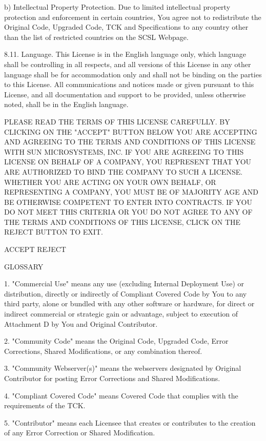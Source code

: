 {b) Intellectual Property Protection.  Due to limited intellectual
property protection and enforcement in certain countries, You agree
not to redistribute the Original Code, Upgraded Code, TCK and
Specifications to any country other than the list of restricted
countries on the SCSL Webpage.

8.11.  Language.  This License is in the English language only, which
language shall be controlling in all respects, and all versions of
this License in any other language shall be for accommodation only and
shall not be binding on the parties to this License.  All
communications and notices made or given pursuant to this License, and
all documentation and support to be provided, unless otherwise noted,
shall be in the English language.

PLEASE READ THE TERMS OF THIS LICENSE CAREFULLY.  BY CLICKING ON THE
"ACCEPT" BUTTON BELOW YOU ARE ACCEPTING AND AGREEING TO THE TERMS AND
CONDITIONS OF THIS LICENSE WITH SUN MICROSYSTEMS, INC.  IF YOU ARE
AGREEING TO THIS LICENSE ON BEHALF OF A COMPANY, YOU REPRESENT THAT
YOU ARE AUTHORIZED TO BIND THE COMPANY TO SUCH A LICENSE.  WHETHER YOU
ARE ACTING ON YOUR OWN BEHALF, OR REPRESENTING A COMPANY, YOU MUST BE
OF MAJORITY AGE AND BE OTHERWISE COMPETENT TO ENTER INTO CONTRACTS.
IF YOU DO NOT MEET THIS CRITERIA OR YOU DO NOT AGREE TO ANY OF THE
TERMS AND CONDITIONS OF THIS LICENSE, CLICK ON THE REJECT BUTTON TO
EXIT.

ACCEPT REJECT

GLOSSARY

1.  "Commercial Use" means any use (excluding Internal Deployment Use)
or distribution, directly or indirectly of Compliant Covered Code by
You to any third party, alone or bundled with any other software or
hardware, for direct or indirect commercial or strategic gain or
advantage, subject to execution of Attachment D by You and Original
Contributor.

2.  "Community Code" means the Original Code, Upgraded Code, Error
Corrections, Shared Modifications, or any combination thereof.

3.  "Community Webserver(s)" means the webservers designated by
Original Contributor for posting Error Corrections and Shared
Modifications.

4.  "Compliant Covered Code" means Covered Code that complies with the
requirements of the TCK.

5.  "Contributor" means each Licensee that creates or contributes to
the creation of any Error Correction or Shared Modification.

}
